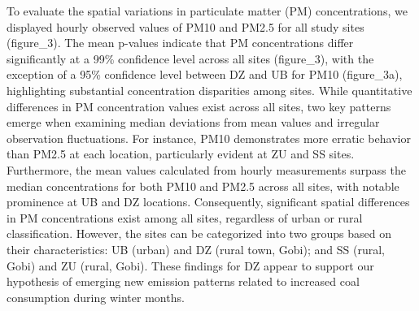 \documentclass[
  11pt,
]{article}
\begin{document}
To evaluate the spatial variations in particulate matter (PM)
concentrations, we displayed hourly observed values of PM10 and PM2.5
for all study sites (figure\_3). The mean p-values indicate that PM
concentrations differ significantly at a 99\% confidence level across
all sites (figure\_3), with the exception of a 95\% confidence level
between DZ and UB for PM10 (figure\_3a), highlighting substantial
concentration disparities among sites. While quantitative differences in
PM concentration values exist across all sites, two key patterns emerge
when examining median deviations from mean values and irregular
observation fluctuations. For instance, PM10 demonstrates more erratic
behavior than PM2.5 at each location, particularly evident at ZU and SS
sites. Furthermore, the mean values calculated from hourly measurements
surpass the median concentrations for both PM10 and PM2.5 across all
sites, with notable prominence at UB and DZ locations. Consequently,
significant spatial differences in PM concentrations exist among all
sites, regardless of urban or rural classification. However, the sites
can be categorized into two groups based on their characteristics: UB
(urban) and DZ (rural town, Gobi); and SS (rural, Gobi) and ZU (rural,
Gobi). These findings for DZ appear to support our hypothesis of
emerging new emission patterns related to increased coal consumption
during winter months.
\end{document}
